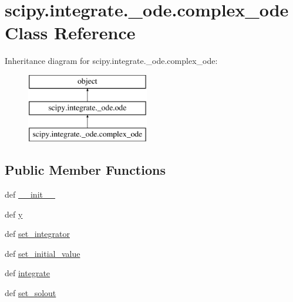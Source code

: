 \hypertarget{classscipy_1_1integrate_1_1__ode_1_1complex__ode}{}\section{scipy.\+integrate.\+\_\+ode.\+complex\+\_\+ode Class Reference}
\label{classscipy_1_1integrate_1_1__ode_1_1complex__ode}
Inheritance diagram for scipy.\+integrate.\+\_\+ode.\+complex\+\_\+ode\+:\begin{figure}[H]
\begin{center}
\leavevmode
\includegraphics[height=3.000000cm]{classscipy_1_1integrate_1_1__ode_1_1complex__ode}
\end{center}
\end{figure}
\subsection*{Public Member Functions}
\begin{DoxyCompactItemize}
\item 
def \hyperlink{classscipy_1_1integrate_1_1__ode_1_1complex__ode_a1814bd084fc5b7873cb78c4a05f0026a}{\+\_\+\+\_\+init\+\_\+\+\_\+}
\item 
def \hyperlink{classscipy_1_1integrate_1_1__ode_1_1complex__ode_a73b3c2211957e8789d57953b15fa0b7c}{y}
\item 
def \hyperlink{classscipy_1_1integrate_1_1__ode_1_1complex__ode_a8f13e08811bf1bf6c1002e21b936a86e}{set\+\_\+integrator}
\item 
def \hyperlink{classscipy_1_1integrate_1_1__ode_1_1complex__ode_ab2094bde7583606f6b55954645f59fa7}{set\+\_\+initial\+\_\+value}
\item 
def \hyperlink{classscipy_1_1integrate_1_1__ode_1_1complex__ode_a9a4e9c8b1a3a89ad5ec2990e598b99ff}{integrate}
\item 
def \hyperlink{classscipy_1_1integrate_1_1__ode_1_1complex__ode_a7150acc324cf47552a90fcedf8dbd2a5}{set\+\_\+solout}
\end{DoxyCompactItemize}

